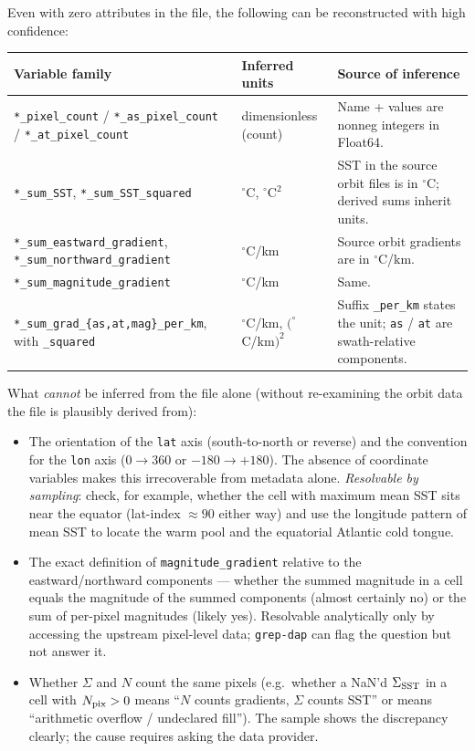 \documentclass[11pt]{article}
\begin{document}
Even with zero attributes in the file, the following can be
reconstructed with high confidence:

\begin{center}
\begin{tabular}{@{}lll@{}}
\toprule
Variable family & Inferred units & Source of inference \\
\midrule
\texttt{*\_pixel\_count} / \texttt{*\_as\_pixel\_count} / \texttt{*\_at\_pixel\_count} & dimensionless (count) & Name + values are nonneg integers in Float64. \\
\texttt{*\_sum\_SST}, \texttt{*\_sum\_SST\_squared} & $^\circ$C, $^\circ$C${}^2$ & SST in the source orbit files is in $^\circ$C; derived sums inherit units. \\
\texttt{*\_sum\_eastward\_gradient}, \texttt{*\_sum\_northward\_gradient} & $^\circ$C/km & Source orbit gradients are in $^\circ$C/km. \\
\texttt{*\_sum\_magnitude\_gradient} & $^\circ$C/km & Same. \\
\texttt{*\_sum\_grad\_\{as,at,mag\}\_per\_km}, with \texttt{\_squared} & $^\circ$C/km, $(^\circ$C/km$)^2$ & Suffix \texttt{\_per\_km} states the unit; \texttt{as} / \texttt{at} are swath-relative components. \\
\bottomrule
\end{tabular}
\end{center}

What \emph{cannot} be inferred from the file alone (without
re-examining the orbit data the file is plausibly derived from):

\begin{itemize}
  \item The orientation of the \texttt{lat} axis (south-to-north
    or reverse) and the convention for the \texttt{lon} axis
    ($0\to 360$ or $-180\to +180$). The absence of coordinate
    variables makes this irrecoverable from metadata alone.
    \emph{Resolvable by sampling}: check, for example, whether
    the cell with maximum mean SST sits near the equator
    (lat-index $\approx 90$ either way) and use the longitude
    pattern of mean SST to locate the warm pool and the equatorial
    Atlantic cold tongue.
  \item The exact definition of \texttt{magnitude\_gradient}
    relative to the eastward/northward components --- whether the
    summed magnitude in a cell equals the magnitude of the summed
    components (almost certainly no) or the sum of per-pixel
    magnitudes (likely yes). Resolvable analytically only by
    accessing the upstream pixel-level data; \texttt{grep-dap}
    can flag the question but not answer it.
  \item Whether $\Sigma$ and $N$ count the same pixels (e.g.\
    whether a NaN'd $\Sigma_{\rm SST}$ in a cell with $N_{\rm
    pix}>0$ means ``$N$ counts gradients, $\Sigma$ counts SST''
    or means ``arithmetic overflow / undeclared fill''). The
    sample shows the discrepancy clearly; the cause requires
    asking the data provider.
\end{itemize}
\end{document}
